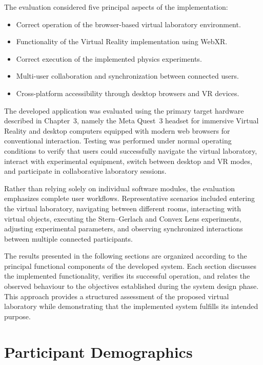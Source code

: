 The evaluation considered five principal aspects of the implementation:

\begin{itemize}
    \item Correct operation of the browser-based virtual laboratory environment.
    \item Functionality of the Virtual Reality implementation using WebXR.
    \item Correct execution of the implemented physics experiments.
    \item Multi-user collaboration and synchronization between connected users.
    \item Cross-platform accessibility through desktop browsers and VR devices.
\end{itemize}

The developed application was evaluated using the primary target hardware described in Chapter~3, namely the Meta Quest~3 headset for immersive Virtual Reality and desktop computers equipped with modern web browsers for conventional interaction. Testing was performed under normal operating conditions to verify that users could successfully navigate the virtual laboratory, interact with experimental equipment, switch between desktop and VR modes, and participate in collaborative laboratory sessions.

Rather than relying solely on individual software modules, the evaluation emphasizes complete user workflows. Representative scenarios included entering the virtual laboratory, navigating between different rooms, interacting with virtual objects, executing the Stern--Gerlach and Convex Lens experiments, adjusting experimental parameters, and observing synchronized interactions between multiple connected participants.

The results presented in the following sections are organized according to the principal functional components of the developed system. Each section discusses the implemented functionality, verifies its successful operation, and relates the observed behaviour to the objectives established during the system design phase. This approach provides a structured assessment of the proposed virtual laboratory while demonstrating that the implemented system fulfills its intended purpose.

\section{Participant Demographics}

